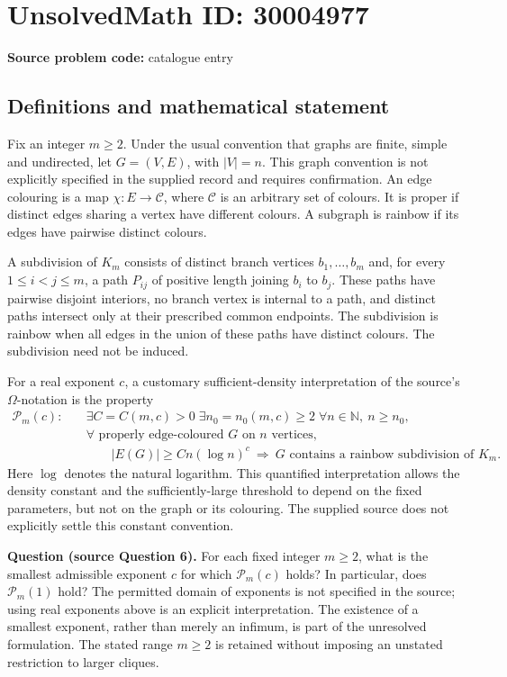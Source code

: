 \documentclass[11pt]{article}
\newcommand{\N}{\mathbb{N}}
\begin{document}
\section*{UnsolvedMath ID: 30004977}
\textbf{Source problem code:} catalogue entry
\subsection{Definitions and mathematical statement}
Fix an integer \(m\geq 2\). Under the usual convention that graphs are finite, simple and undirected, let \(G=(V,E)\), with \(|V|=n\). This graph convention is not explicitly specified in the supplied record and requires confirmation. An edge colouring is a map \(\chi:E\to\mathcal C\), where \(\mathcal C\) is an arbitrary set of colours. It is proper if distinct edges sharing a vertex have different colours. A subgraph is rainbow if its edges have pairwise distinct colours.

A subdivision of \(K_m\) consists of distinct branch vertices \(b_1,\ldots,b_m\) and, for every \(1\leq i<j\leq m\), a path \(P_{ij}\) of positive length joining \(b_i\) to \(b_j\). These paths have pairwise disjoint interiors, no branch vertex is internal to a path, and distinct paths intersect only at their prescribed common endpoints. The subdivision is rainbow when all edges in the union of these paths have distinct colours. The subdivision need not be induced.

For a real exponent \(c\), a customary sufficient-density interpretation of the source's \(\Omega\)-notation is the property
\[
\begin{aligned}
\mathcal P_m(c):\quad
&\exists C=C(m,c)>0\;\exists n_0=n_0(m,c)\geq 2\;\forall n\in\N,\ n\geq n_0,\\
&\forall\text{ properly edge-coloured }G\text{ on }n\text{ vertices},\\
&\qquad |E(G)|\geq Cn(\log n)^c
\ \Longrightarrow\ G\text{ contains a rainbow subdivision of }K_m.
\end{aligned}
\]
Here \(\log\) denotes the natural logarithm. This quantified interpretation allows the density constant and the sufficiently-large threshold to depend on the fixed parameters, but not on the graph or its colouring. The supplied source does not explicitly settle this constant convention.

\textbf{Question (source Question 6).} For each fixed integer \(m\geq 2\), what is the smallest admissible exponent \(c\) for which \(\mathcal P_m(c)\) holds? In particular, does \(\mathcal P_m(1)\) hold? The permitted domain of exponents is not specified in the source; using real exponents above is an explicit interpretation. The existence of a smallest exponent, rather than merely an infimum, is part of the unresolved formulation. The stated range \(m\geq 2\) is retained without imposing an unstated restriction to larger cliques.
\end{document}
